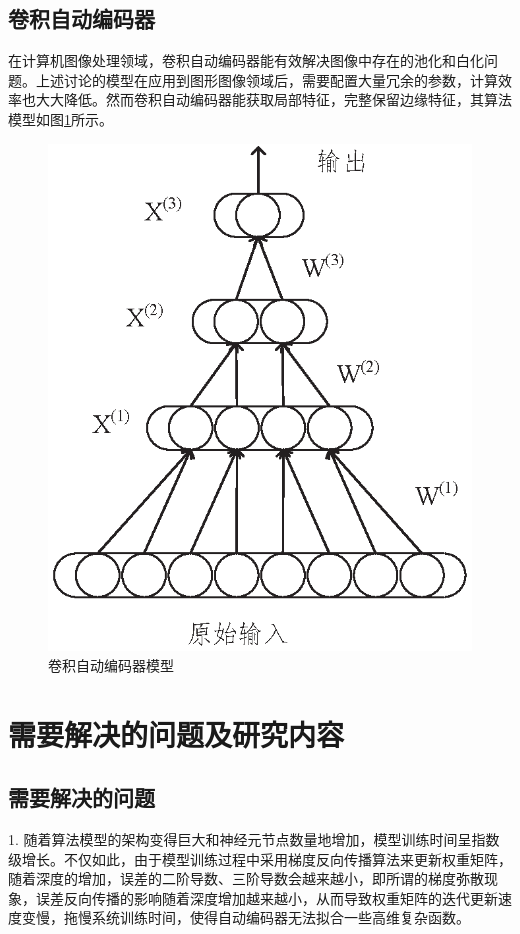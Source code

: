 \documentclass[oneside]{ZJUthesis}
\begin{document}
\subsection{卷积自动编码器}
在计算机图像处理领域，卷积自动编码器能有效解决图像中存在的池化和白化问题。上述讨论的模型在应用到图形图像领域后，需要配置大量冗余的参数，计算效率也大大降低。然而卷积自动编码器能获取局部特征，完整保留边缘特征，其算法模型如图\ref{fig:conv}所示。
\begin{figure}[H]
\centering
\includegraphics[scale=0.6]{./Pictures/conAE.eps}
\caption{卷积自动编码器模型\label{fig:conv}}
\end{figure}


\section{需要解决的问题及研究内容}
\subsection{需要解决的问题}
1. 随着算法模型的架构变得巨大和神经元节点数量地增加，模型训练时间呈指数级增长。不仅如此，由于模型训练过程中采用梯度反向传播算法来更新权重矩阵，随着深度的增加，误差的二阶导数、三阶导数会越来越小，即所谓的梯度弥散现象，误差反向传播的影响随着深度增加越来越小，从而导致权重矩阵的迭代更新速度变慢，拖慢系统训练时间，使得自动编码器无法拟合一些高维复杂函数\cite{35}。 
\end{document}
